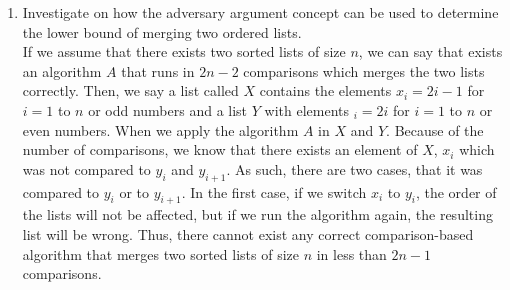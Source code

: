 \documentclass{article}
\begin{document}
\begin{enumerate}
    \item Investigate on how the adversary argument concept can be used to determine the lower bound of merging two ordered lists.\\
    If we assume that there exists two sorted lists of size $n$, we can say that exists an algorithm $A$ that runs in $2n-2$ comparisons which merges the two lists correctly. Then, we say a list called $X$ contains the elements $x_i= 2i -1$ for $i=1$ to $n$ or odd numbers and a list $Y$ with elements $_i= 2i $ for $i=1$ to $n$ or even numbers. When we apply the algorithm $A$ in $X$ and $Y$. Because of the number of comparisons, we know that there exists an element of $X$, $x_i$ which was not compared to $y_i$ and $y_{i + 1}$. As such, there are two cases, that it was compared to $y_i$ or to $y_{i +1}$. In the first case, if we switch $x_i$ to $y_i$, the order of the lists will not be affected, but if we run the algorithm again, the resulting list will be wrong. Thus, there cannot exist any correct comparison-based algorithm that merges two sorted lists of size $n$ in less than $2n-1$ comparisons.
\end{enumerate}
\end{document}
